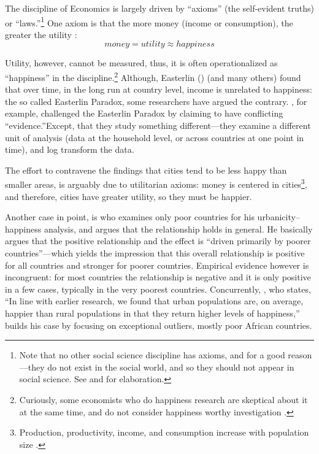 \documentclass[10pt, letterpaper]{article}
\begin{document}
%
%
The discipline of Economics is largely driven by ``axioms'' (the self-evident truths)
or ``laws.''\footnote{Note that no other social science discipline has axioms, and for a good
reason---they do not exist in the social world, and so they should not appear in
social science. See \citet{feynman81} and \cite{davies18} for elaboration.} 
One axiom is that the more money (income or consumption), the greater the utility \citep[e.g.,][]{autor10}:
\begin{equation}
money = utility \approx happiness
\end{equation}%

Utility, however, cannot be measured, thus, it is often operationalized as ``happiness'' in the discipline.\footnote{Curiously, some economists who do happiness research are skeptical about it at the same time, and do not consider happiness worthy investigation \citep[e.g.,][]{deaton13c,glaeser14B,glaeser14}.} Although, Easterlin (\citeyear{easterlin15B,easterlin10B}) (and many others) found that over time, in the long run at country level, income is unrelated to happiness: the so called Easterlin Paradox, some researchers have argued the contrary.  \citet{stevenson13}, for example, challenged the Easterlin Paradox by claiming to have conflicting ``evidence.''Except, that they study something different---they examine a different unit of analysis (data at the household level, or across countries at one point in time), and log transform the data. 

The effort to contravene the findings that cities tend to be less happy than smaller areas, is arguably due to utilitarian axioms: money is centered in cities\footnote{Production, productivity, income, and consumption increase with population size \cite{glaeser11C,glaeser07,glaeser01,rosenthal02,rosenthal03,rosenthal08}.}, and therefore, cities have greater utility, so they must be happier. 

Another case in point, is \citet{glaeser11} who examines only poor countries for his urbanicity--happiness analysis, and argues that the relationship holds in general. He basically argues that the positive relationship and the effect is ``driven primarily by poorer countries''---which yields the impression that this overall relationship is
positive for all countries and stronger for poorer countries. Empirical evidence however is incongruent: for most countries the relationship is negative and it is only positive in a few cases, typically in the very poorest countries. Concurrently, \citep{burger20}, who states, ``In line with earlier research, we found that
urban populations are, on average, happier than rural populations in that they return higher levels of happiness,'' builds his case by focusing on exceptional outliers, mostly poor African countries. 
\end{document}
